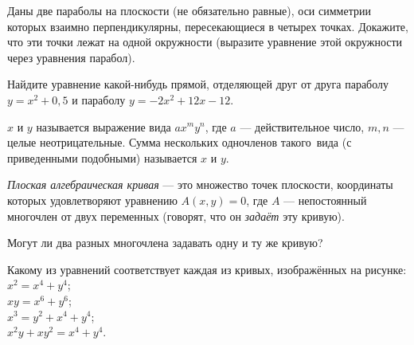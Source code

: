 \documentclass[a4paper, 12pt]{article}
\begin{document}
Даны две параболы на плоскости (не обязательно равные), оси симметрии которых взаимно перпендикулярны, пересекающиеся в четырех точках.
Докажите, что эти точки лежат на одной окружности (выразите уравнение этой окружности через уравнения парабол).


Найдите уравнение какой-нибудь прямой, отделяющей друг от друга параболу
$y=x^2+0,5$ и параболу $y=-2x^2+12x-12$.

\/ $x$ и $y$ называется выражение
вида $ax^my^n$, где $a$ --- действительное число, $m,n$ --- целые неотрицательные.
Сумма нескольких одночленов такого~вида
(с приведенными подобными)
называется \/ $x$ и $y$.

%

{}
{\it Плоская алгебраическая кривая}\/ --- это множество точек
плоскости, координаты которых удовлетворяют уравнению
$A(x,y)=0$,  где $A$ --- %
непостоянный многочлен от двух переменных (говорят, что он {\it задаёт}\/ эту кривую).

Могут ли два разных многочлена задавать одну и ту же кривую?

Какому из уравнений соответствует каждая из
кривых, изображённых на рисунке:\\
 $x^2=x^4+y^4$;\\
 $xy=x^6+y^6$;\\
 $x^3=y^2+x^4+y^4$;\\
 $x^2y+xy^2=x^4+y^4$.

%
\vspace*{-10mm}
\vspace*{5mm}
\end{document}
